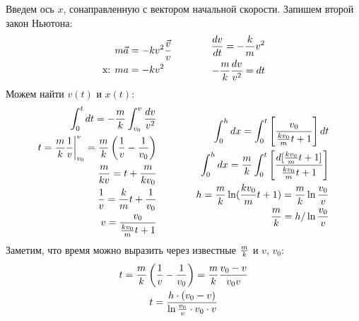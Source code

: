 \documentclass[a5paper,10pt]{article}
\begin{document}
Введем ось $x$, сонаправленную с вектором начальной скорости.
Запишем второй закон Ньютона:
\begin{equation*}
    \xdef\km{\frac{k}{m}}\xdef\mk{\frac{m}{k}}\xdef\mgk{\frac{mg}{k}}%
    \begin{aligned}[c]
        m\vec{a}&=-kv^2\frac{\vec{v}}{v}\\
        \text{x: } ma&=-kv^2\\
    \end{aligned}
        \qquad\qquad
    \begin{aligned}[c]
        \frac{dv}{dt}=-\km{}v^2\\
        -\mk\frac{dv}{v^2}=dt\\
    \end{aligned}
\end{equation*}
Можем найти $v(t)$ и $x(t)$:
\begin{equation*}
    \begin{aligned}[c]
        \int_0^{t}dt=-\mk\int_{v_0}^{v}\frac{dv}{v^2}\\
        t=\mk\frac{1}{v}\bigg|_{v_0}^{v}=\mk\left(\frac{1}{v}- \frac{1}{v_0}\right)\\
        \frac{m}{kv}=t+\frac{m}{kv_0}\\
        \frac{1}{v}=\km{t}+\frac{1}{v_0}\\
        v=\frac{v_0}{\frac{kv_0}{m}t+1}
    \end{aligned}
        \qquad\qquad
    \begin{aligned}[c]
        \int_0^{h}dx=\int_{0}^{t}\left[\frac{v_0}{\frac{kv_0}{m}t+1}\right]dt\\
        \int_0^{h}dx=\frac{m}{k}\int_{0}^{t}\left[\frac{d[\frac{kv_0}{m}t+1]}{\frac{kv_0}{m}t+1}\right]\\
        h=\mk\ln(\frac{kv_0}{m}t+1)=\mk\ln\frac{v_0}{v}\\
        \mk=h/\ln\frac{v_0}{v}
    \end{aligned}
\end{equation*}
Заметим, что время можно выразить через известные $\mk$ и $v$, $v_0$:
\begin{gather*}
        t=\mk\left(\frac{1}{v}- \frac{1}{v_0}\right)=\mk\frac{v_0-v}{v_0v}\\
        t=\frac{h\cdot(v_0-v)}{\ln\frac{v_0}{v}\cdot{v_0}\cdot{v}}
\end{gather*}
\end{document}
